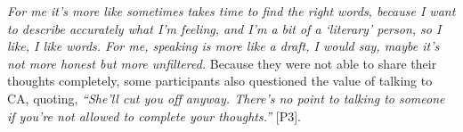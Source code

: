                 \textit{
                For me it's more like sometimes takes time to find the right words, because I want to describe accurately what I'm feeling, and I'm a bit of a `literary' person, so I like, I like words.
                For me, speaking is more like a draft, I would say, maybe it's not more honest but more unfiltered. 
                }
        Because they were not able to share their thoughts completely, some participants also questioned the value of talking to \ac{CA}, quoting,
                \textit{``She'll cut you off anyway. There's no point to talking to someone if you're not allowed to complete your thoughts.''}
                [P3].
        
